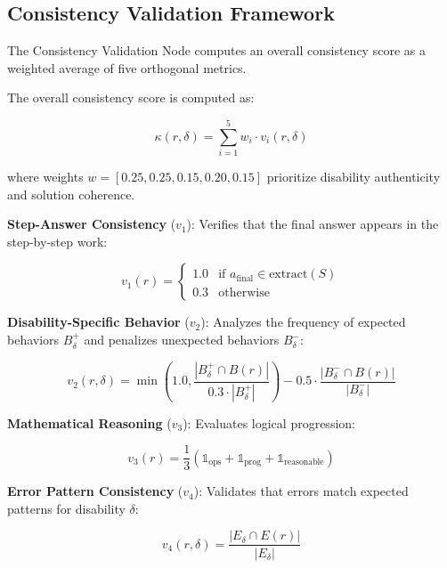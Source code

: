\documentclass[11pt]{article}
\begin{document}
\subsection{Consistency Validation Framework}

The Consistency Validation Node computes an overall consistency score as a weighted average of five orthogonal metrics.

The overall consistency score is computed as:

\begin{equation}
\kappa(r, \delta) = \sum_{i=1}^{5} w_i \cdot v_i(r, \delta)
\label{eq:consistency}
\end{equation}

where weights $w = [0.25, 0.25, 0.15, 0.20, 0.15]$ prioritize disability authenticity and solution coherence.

\textbf{Step-Answer Consistency} ($v_1$): Verifies that the final answer appears in the step-by-step work:

\begin{equation}
v_1(r) = \begin{cases}
1.0 & \text{if } a_{\text{final}} \in \text{extract}(S) \\
0.3 & \text{otherwise}
\end{cases}
\label{eq:step_answer}
\end{equation}

\textbf{Disability-Specific Behavior} ($v_2$): Analyzes the frequency of expected behaviors $B_\delta^+$ and penalizes unexpected behaviors $B_\delta^-$:

\begin{equation}
v_2(r, \delta) = \min\left(1.0, \frac{|B_\delta^+ \cap B(r)|}{0.3 \cdot |B_\delta^+|}\right) - 0.5 \cdot \frac{|B_\delta^- \cap B(r)|}{|B_\delta^-|}
\label{eq:behavior}
\end{equation}

\textbf{Mathematical Reasoning} ($v_3$): Evaluates logical progression:

\begin{equation}
v_3(r) = \frac{1}{3}\left(\mathbb{1}_{\text{ops}} + \mathbb{1}_{\text{prog}} + \mathbb{1}_{\text{reasonable}}\right)
\label{eq:math_reasoning}
\end{equation}

\textbf{Error Pattern Consistency} ($v_4$): Validates that errors match expected patterns for disability $\delta$:

\begin{equation}
v_4(r, \delta) = \frac{|E_\delta \cap E(r)|}{|E_\delta|}
\label{eq:error_patterns}
\end{equation}
\end{document}
